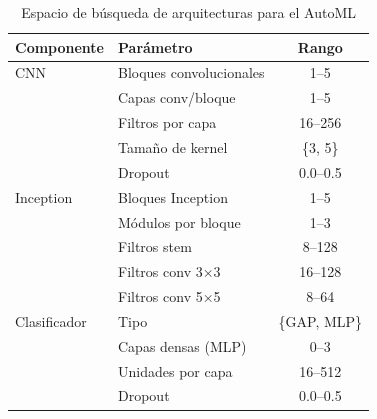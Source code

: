 \begin{table}[htbp]
\centering
\caption{Espacio de búsqueda de arquitecturas para el AutoML}
\label{tab:search_space}
\small
\begin{tabular}{llc}
\toprule
\textbf{Componente} & \textbf{Parámetro} & \textbf{Rango} \\
\midrule
CNN & Bloques convolucionales & 1--5 \\
    & Capas conv/bloque & 1--5 \\
    & Filtros por capa & 16--256 \\
    & Tamaño de kernel & \{3, 5\} \\
    & Dropout & 0.0--0.5 \\
\midrule
Inception & Bloques Inception & 1--5 \\
          & Módulos por bloque & 1--3 \\
          & Filtros stem & 8--128 \\
          & Filtros conv 3$\times$3 & 16--128 \\
          & Filtros conv 5$\times$5 & 8--64 \\
\midrule
Clasificador & Tipo & \{GAP, MLP\} \\
             & Capas densas (MLP) & 0--3 \\
             & Unidades por capa & 16--512 \\
             & Dropout & 0.0--0.5 \\
\bottomrule
\end{tabular}
\end{table}
